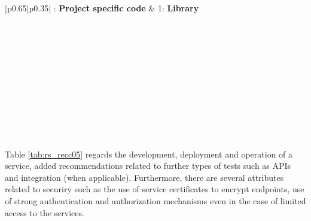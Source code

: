 \begin{center}
    \tabletail{\hline}
    \label{tab:rs_recc04}
    \small
    \begin{supertabular}{|p{0.65\linewidth}|p{0.35\linewidth}|} : \textbf{Project specific code} &
    1: \textbf{Library} \\ \hline \hline

     \\ \hline
     \\ \hline
     \\ \hline
     \\ \hline
     \\ \hline
     \\ \hline
     \\ \hline
     \\ \hline
     \\ \hline
     \\ \hline

\end{supertabular}
\end{center}

Table \ref{tab:rs_recc05} regards the development, deployment and operation of a service, added recommendations related to further types of tests such as APIs and integration (when applicable). Furthermore, there are several attributes related to securiry such as the use of service certificates to encrypt endpoints, use of strong authentication and authorization mechanisms even in the case of limited access to the services.

